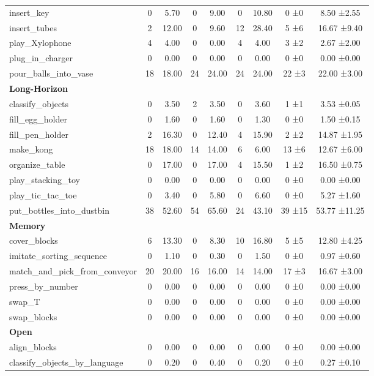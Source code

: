 \begin{table}[H]
{\begin{tabular}{l|c|c|c|c|c|c|c|c}
insert\_key & 0 & 5.70 & 0 & 9.00 & 0 & 10.80 & 0 ±0 & 8.50 ±2.55 \\
insert\_tubes & 2 & 12.00 & 0 & 9.60 & 12 & 28.40 & 5 ±6 & 16.67 ±9.40 \\
play\_Xylophone & 4 & 4.00 & 0 & 0.00 & 4 & 4.00 & 3 ±2 & 2.67 ±2.00 \\
plug\_in\_charger & 0 & 0.00 & 0 & 0.00 & 0 & 0.00 & 0 ±0 & 0.00 ±0.00 \\
pour\_balls\_into\_vase & 18 & 18.00 & 24 & 24.00 & 24 & 24.00 & 22 ±3 & 22.00 ±3.00 \\
\hline
\multicolumn{9}{l}{\textbf{Long-Horizon}} \\
classify\_objects & 0 & 3.50 & 2 & 3.50 & 0 & 3.60 & 1 ±1 & 3.53 ±0.05 \\
fill\_egg\_holder & 0 & 1.60 & 0 & 1.60 & 0 & 1.30 & 0 ±0 & 1.50 ±0.15 \\
fill\_pen\_holder & 2 & 16.30 & 0 & 12.40 & 4 & 15.90 & 2 ±2 & 14.87 ±1.95 \\
make\_kong & 18 & 18.00 & 14 & 14.00 & 6 & 6.00 & 13 ±6 & 12.67 ±6.00 \\
organize\_table & 0 & 17.00 & 0 & 17.00 & 4 & 15.50 & 1 ±2 & 16.50 ±0.75 \\
play\_stacking\_toy & 0 & 0.00 & 0 & 0.00 & 0 & 0.00 & 0 ±0 & 0.00 ±0.00 \\
play\_tic\_tac\_toe & 0 & 3.40 & 0 & 5.80 & 0 & 6.60 & 0 ±0 & 5.27 ±1.60 \\
put\_bottles\_into\_dustbin & 38 & 52.60 & 54 & 65.60 & 24 & 43.10 & 39 ±15 & 53.77 ±11.25 \\
\hline
\multicolumn{9}{l}{\textbf{Memory}} \\
cover\_blocks & 6 & 13.30 & 0 & 8.30 & 10 & 16.80 & 5 ±5 & 12.80 ±4.25 \\
imitate\_sorting\_sequence & 0 & 1.10 & 0 & 0.30 & 0 & 1.50 & 0 ±0 & 0.97 ±0.60 \\
match\_and\_pick\_from\_conveyor & 20 & 20.00 & 16 & 16.00 & 14 & 14.00 & 17 ±3 & 16.67 ±3.00 \\
press\_by\_number & 0 & 0.00 & 0 & 0.00 & 0 & 0.00 & 0 ±0 & 0.00 ±0.00 \\
swap\_T & 0 & 0.00 & 0 & 0.00 & 0 & 0.00 & 0 ±0 & 0.00 ±0.00 \\
swap\_blocks & 0 & 0.00 & 0 & 0.00 & 0 & 0.00 & 0 ±0 & 0.00 ±0.00 \\
\hline
\multicolumn{9}{l}{\textbf{Open}} \\
align\_blocks & 0 & 0.00 & 0 & 0.00 & 0 & 0.00 & 0 ±0 & 0.00 ±0.00 \\
classify\_objects\_by\_language & 0 & 0.20 & 0 & 0.40 & 0 & 0.20 & 0 ±0 & 0.27 ±0.10 \\

\end{tabular}}
\end{table}

